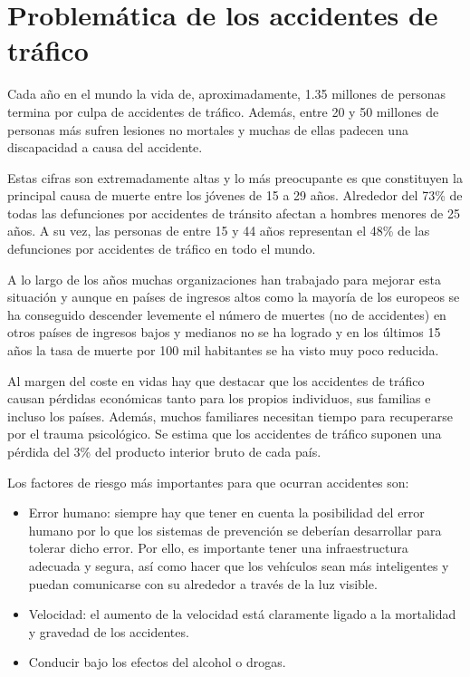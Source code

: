 
\minitoc

\section{Problemática de los accidentes de tráfico}

Cada año en el mundo la vida de, aproximadamente, 1.35 millones de personas termina por culpa de accidentes de tráfico. Además, entre 20 y 50 millones de personas más sufren lesiones no mortales y muchas de ellas padecen una discapacidad a causa del accidente. \cite{who1}

Estas cifras son extremadamente altas y lo más preocupante es que constituyen la principal causa de muerte entre los jóvenes de 15 a 29 años. Alrededor del 73\% de todas las defunciones por accidentes de tránsito afectan a hombres menores de 25 años. A su vez, las personas de entre 15 y 44 años representan el 48\% de las defunciones por accidentes de tráfico en todo el mundo. \cite{who1}

A lo largo de los años muchas organizaciones han trabajado para mejorar esta situación y aunque en países de ingresos altos como la mayoría de los europeos se ha conseguido descender levemente el número de muertes (no de accidentes) en otros países de ingresos bajos y medianos no se ha logrado y en los últimos 15 años la tasa de muerte por 100 mil habitantes se ha visto muy poco reducida.

Al margen del coste en vidas hay que destacar que los accidentes de tráfico causan pérdidas económicas tanto para los propios individuos, sus familias e incluso los países. Además, muchos familiares necesitan tiempo para recuperarse por el trauma psicológico. Se estima que los accidentes de tráfico suponen una pérdida del 3\% del producto interior bruto de cada país. \cite{who1}

Los factores de riesgo más importantes para que ocurran accidentes son:
\begin{itemize}
    \item Error humano: siempre hay que tener en cuenta la posibilidad del error humano por lo que los sistemas de prevención se deberían desarrollar para tolerar dicho error. Por ello, es importante tener una infraestructura adecuada y segura, así como hacer que los vehículos sean más inteligentes y puedan comunicarse con su alrededor a través de la luz visible.
    \item Velocidad: el aumento de la velocidad está claramente ligado a la mortalidad y gravedad de los accidentes.
    \item Conducir bajo los efectos del alcohol o drogas.
\end{itemize}

